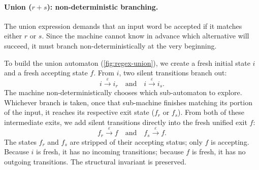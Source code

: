 \paragraph{Union ($r + s$): non-deterministic branching.}
The union expression demands that an input word be accepted if it matches either $r$ or $s$. Since the machine cannot know in advance which alternative will succeed, it must branch non-deterministically at the very beginning.

To build the union automaton (\cref{fig:regex-union}), we create a fresh initial state $i$ and a fresh accepting state $f$. From $i$, two silent transitions branch out:
\[
  i \xrightarrow{\varepsilon} i_r \quad \text{and} \quad i \xrightarrow{\varepsilon} i_s.
\]
The machine non-deterministically chooses which sub-automaton to explore. Whichever branch is taken, once that sub-machine finishes matching its portion of the input, it reaches its respective exit state ($f_r$ or $f_s$). From both of these intermediate exits, we add silent transitions directly into the fresh unified exit $f$:
\[
  f_r \xrightarrow{\varepsilon} f \quad \text{and} \quad f_s \xrightarrow{\varepsilon} f.
\]
The states $f_r$ and $f_s$ are stripped of their accepting status; only $f$ is accepting. Because $i$ is fresh, it has no incoming transitions; because $f$ is fresh, it has no outgoing transitions. The structural invariant is preserved.

\begin{center}
\begin{minipage}{\linewidth}
\centering
{}
\label{fig:regex-union}
\end{minipage}
\end{center}

